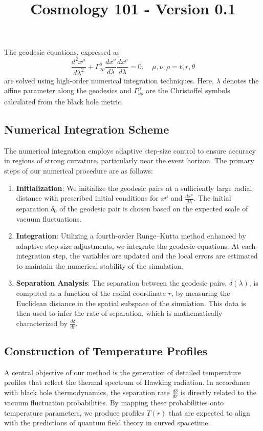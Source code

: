 \documentclass{article}\usepackage{graphicx} \usepackage{amsmath} \usepackage{colortbl}\title{Cosmology 101 - Version 0.1}
\begin{document}
The geodesic equations, expressed as
\begin{equation}
\frac{d^2x^{\mu}}{d\lambda^2}+\Gamma^{\mu}_{\nu\rho}\frac{dx^{\nu}}{d\lambda}\frac{dx^{\rho}}{d\lambda}=0, \quad \mu,\nu,\rho=t, r, \theta 
\end{equation}
are solved using high-order numerical integration techniques. Here, $\lambda$ denotes the affine parameter along the geodesics and $\Gamma^{\mu}_{\nu\rho}$ are the Christoffel symbols calculated from the black hole metric. 

\subsection{Numerical Integration Scheme}
The numerical integration employs adaptive step-size control to ensure accuracy in regions of strong curvature, particularly near the event horizon. The primary steps of our numerical procedure are as follows:
\begin{enumerate}
    \item \textbf{Initialization}: We initialize the geodesic pairs at a sufficiently large radial distance with prescribed initial conditions for $x^{\mu}$ and $\frac{dx^{\mu}}{d\lambda}$. The initial separation $\delta_0$ of the geodesic pair is chosen based on the expected scale of vacuum fluctuations.
    \item \textbf{Integration}: Utilizing a fourth-order Runge–Kutta method enhanced by adaptive step-size adjustments, we integrate the geodesic equations. At each integration step, the variables are updated and the local errors are estimated to maintain the numerical stability of the simulation.
    \item \textbf{Separation Analysis}: The separation between the geodesic pairs, $\delta(\lambda)$, is computed as a function of the radial coordinate $r$, by measuring the Euclidean distance in the spatial subspace of the simulation. This data is then used to infer the rate of separation, which is mathematically characterized by $\frac{d\delta}{dr}$.
\end{enumerate}

\subsection{Construction of Temperature Profiles}
A central objective of our method is the generation of detailed temperature profiles that reflect the thermal spectrum of Hawking radiation. In accordance with black hole thermodynamics, the separation rate $\frac{d\delta}{dr}$ is directly related to the vacuum fluctuation probabilities. By mapping these probabilities onto temperature parameters, we produce profiles $T(r)$ that are expected to align with the predictions of quantum field theory in curved spacetime.
\end{document}
